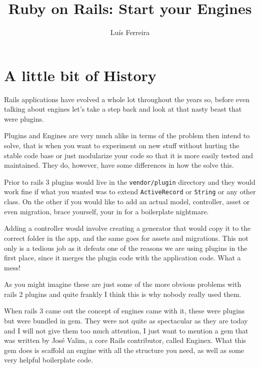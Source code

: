 \documentclass[12pt,a4paper,twoside]{book}
\begin{document}

\title{Ruby on Rails: Start your Engines}
\author{Luís Ferreira}

\maketitle

\tableofcontents
\newpage

\chapter{A little bit of History}
Rails applications have evolved a whole lot throughout the years so, before even talking about engines let's take a step back and look at that nasty beast that were plugins.

Plugins and Engines are very much alike in terms of the problem then intend to solve, that is when you want to experiment on new stuff without hurting the stable code base or just modularize your code so that it is more easily tested and maintained. They do, however, have some differences in how the solve this.

Prior to rails 3 plugins would live in the \verb=vendor/plugin= directory and they would work fine if what you wanted was to extend \verb=ActiveRecord= or \verb=String= or any other class. On the other if you would like to add an actual model, controller, asset or even migration, brace yourself, your in for a boilerplate nightmare.

Adding a controller would involve creating a generator that would copy it to the correct folder in the app, and the same goes for assets and migrations. This not only is a tedious job as it defeats one of the reasons we are using plugins in the first place, since it merges the plugin code with the application code. What a mess!

As you might imagine these are just some of the more obvious problems with rails 2 plugins and quite frankly I think this is why nobody really used them.

When rails 3 came out the concept of engines came with it, these were plugins but were bundled in gem. They were not quite as spectacular as they are today and I will not give them too much attention, I just want to mention a gem that was written by José Valim, a core Rails contributor, called Enginex. What this gem does is scaffold an engine with all the structure you need, as well as some very helpful boilerplate code.
\end{document}
